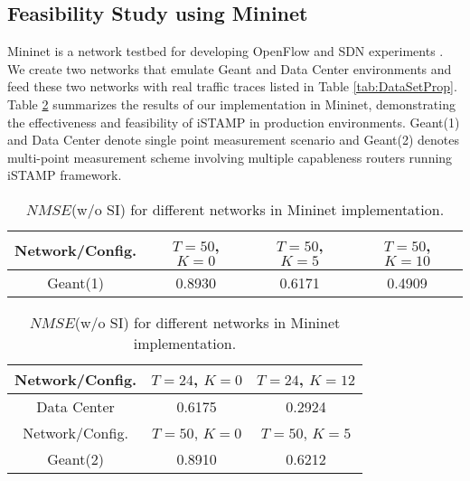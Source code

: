 \subsection{Feasibility Study using Mininet}
Mininet is a network testbed for developing OpenFlow and SDN experiments \cite{MininetOrg}. We create two networks that emulate Geant and Data Center environments and feed these two networks with real traffic traces listed in Table \ref{tab:DataSetProp}. Table \ref{tab:MininetResultsTab1} summarizes the results of our implementation in Mininet, demonstrating the effectiveness and feasibility of iSTAMP in production environments. Geant(1) and Data Center denote single point measurement scenario and Geant(2) denotes multi-point measurement scheme involving multiple capableness routers running iSTAMP framework.

\begin{table}[b]
	\centering
 \footnotesize{
 \renewcommand{\tabcolsep}{0.05cm}
 \renewcommand{\arraystretch}{1.0}
		\begin{tabular}{| c | c | c | c |}
		\hline
       Network/Config. &  $T=50$, $K=0$   &  $T=50$, $K=5$  &  $T=50$, $K=10$  \\ \hline
      Geant(1)                      &  0.8930	 &  0.6171 	&  0.4909                 \\ \hline
    \end{tabular}
    \newline
\vspace*{0.15cm}
\newline
		\begin{tabular}{| c | c | c |}
		\hline
       Network/Config. &  $T=24$, $K=0$   &  $T=24$, $K=12$     \\ \hline
      Data Center                   &   0.6175	 &  0.2924             \\ \hline
		\hline
       Network/Config. &  $T=50$, $K=0$ & $T=50$, $K=5$  \\ \hline
      Geant(2)         &  0.8910	      &  0.6212    \\ \hline
    \end{tabular}
	\caption{\scriptsize{$NMSE$(w/o SI) for different networks in Mininet implementation.}}
	\label{tab:MininetResultsTab1}
}
\end{table}

